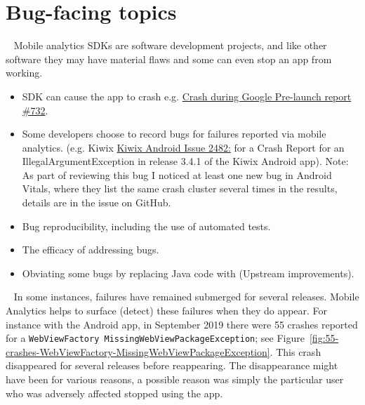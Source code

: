 \section{Bug-facing topics}~\label{aata-bug-facing-topics}
Mobile analytics SDKs are software development projects, and like other software they may have material flaws and some can even stop an app from working. 

\begin{itemize}
    \itemsep0em 
    \item SDK can cause the app to crash e.g. \href{https://github.com/segmentio/analytics-android/issues/732}{Crash during Google Pre-launch report \#732}.
    \item Some developers choose to record bugs for failures reported via mobile analytics. (e.g. Kiwix \href{https://github.com/kiwix/kiwix-android/issues/2482}{Kiwix Android Issue 2482:} for a Crash Report for an IllegalArgumentException in release 3.4.1 of the Kiwix Android app). Note: As part of reviewing this bug I noticed at least one new bug in Android Vitals, where they list the same crash cluster several times in the results, details are in the issue on GitHub.
    \item Bug reproducibility, including the use of automated tests.
    \item The efficacy of addressing bugs.
    \item Obviating some bugs by replacing Java code with  (Upstream improvements).
\end{itemize}

~\label{section-intermittent-appearances-of-bugs-55-crashes}
In some instances, failures have remained submerged for several releases. Mobile Analytics helps to surface (detect) these failures when they do appear. 
For instance with the  Android app, in September 2019 there were 55 crashes reported for a \texttt{WebViewFactory MissingWebViewPackageException}; see Figure~\ref{fig:55-crashes-WebViewFactory-MissingWebViewPackageException}. This crash disappeared for several releases before reappearing. The disappearance might have been for various reasons, a possible reason was simply the particular user who was adversely affected stopped using the app. 

